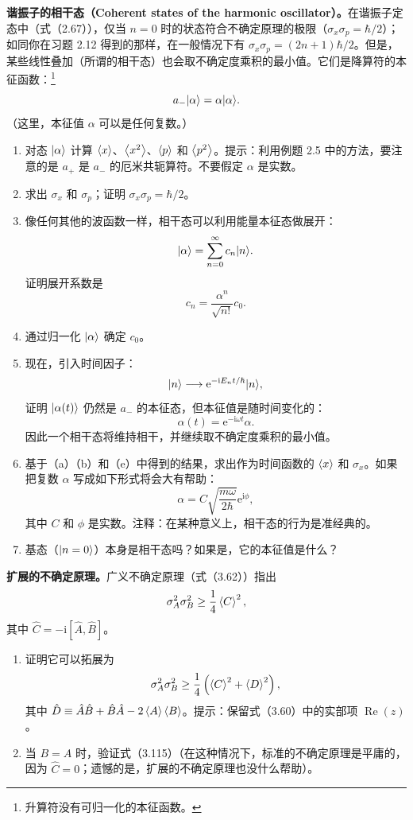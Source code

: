 \begingroup\small
\setlength{\abovedisplayskip}{5pt}
\setlength{\belowdisplayskip}{5pt}
\textbf{谐振子的相干态（Coherent states of the harmonic oscillator）。}在谐振子定态中（式（2.67）），仅当 $n=0$ 时的状态符合不确定原理的极限（$\sigma_x\sigma_p=\hbar/2$）；如同你在习题 2.12 得到的那样，在一般情况下有 $\sigma_x\sigma_p=(2n+1)\hbar/2$。但是，某些线性叠加（所谓的相干态）也会取不确定度乘积的最小值。它们是降算符的本征函数：\footnote{升算符没有可归一化的本征函数。}
\[
a_-\lvert \alpha\rangle=\alpha\lvert \alpha\rangle.
\]
（这里，本征值 $\alpha$ 可以是任何复数。）
\begin{enumerate}
\item 对态 $\lvert \alpha\rangle$ 计算 $\left\langle x\right\rangle$、$\left\langle x^2\right\rangle$、$\left\langle p\right\rangle$ 和 $\left\langle p^2\right\rangle$。提示：利用例题 2.5 中的方法，要注意的是 $a_+$ 是 $a_-$ 的厄米共轭算符。不要假定 $\alpha$ 是实数。
\item 求出 $\sigma_x$ 和 $\sigma_p$；证明 $\sigma_x\sigma_p=\hbar/2$。
\item 像任何其他的波函数一样，相干态可以利用能量本征态做展开：
\[
\lvert \alpha\rangle=\sum_{n=0}^{\infty}c_n\lvert n\rangle.
\]
证明展开系数是
\[
c_n=\frac{\alpha^n}{\sqrt{n!}}c_0.
\]
\item 通过归一化 $\lvert \alpha\rangle$ 确定 $c_0$。
\item 现在，引入时间因子：
\[
\lvert n\rangle\longrightarrow\mathrm{e}^{-\mathrm{i}E_nt/\hbar}\lvert n\rangle,
\]
证明 $\lvert \alpha(t)\rangle$ 仍然是 $a_-$ 的本征态，但本征值是随时间变化的：
\[
\alpha(t)=\mathrm{e}^{-\mathrm{i}\omega t}\alpha.
\]
因此一个相干态将维持相干，并继续取不确定度乘积的最小值。
\item 基于（a）（b）和（e）中得到的结果，求出作为时间函数的 $\left\langle x\right\rangle$ 和 $\sigma_x$。如果把复数 $\alpha$ 写成如下形式将会大有帮助：
\[
\alpha=C\sqrt{\frac{m\omega}{2\hbar}}\mathrm{e}^{\mathrm{i}\phi},
\]
其中 $C$ 和 $\phi$ 是实数。注释：在某种意义上，相干态的行为是准经典的。
\item 基态（$\lvert n=0\rangle$）本身是相干态吗？如果是，它的本征值是什么？
\end{enumerate}
\endgroup
\vfill

\textbf{扩展的不确定原理。}广义不确定原理（式（3.62））指出
\[
\sigma_A^2\sigma_B^2\geq\frac14\left\langle C\right\rangle^2,
\]
其中 $\hat C=-\mathrm{i}[\hat A,\hat B]$。
\begin{enumerate}
\item 证明它可以拓展为
\[
\sigma_A^2\sigma_B^2\geq\frac14\left(\left\langle C\right\rangle^2+\left\langle D\right\rangle^2\right),
\]
其中 $\hat D\equiv\hat A\hat B+\hat B\hat A-2\left\langle A\right\rangle\left\langle B\right\rangle$。提示：保留式（3.60）中的实部项 $\operatorname{Re}(z)$。
\item 当 $B=A$ 时，验证式（3.115）（在这种情况下，标准的不确定原理是平庸的，因为 $\hat C=0$；遗憾的是，扩展的不确定原理也没什么帮助）。
\end{enumerate}
\vfill

